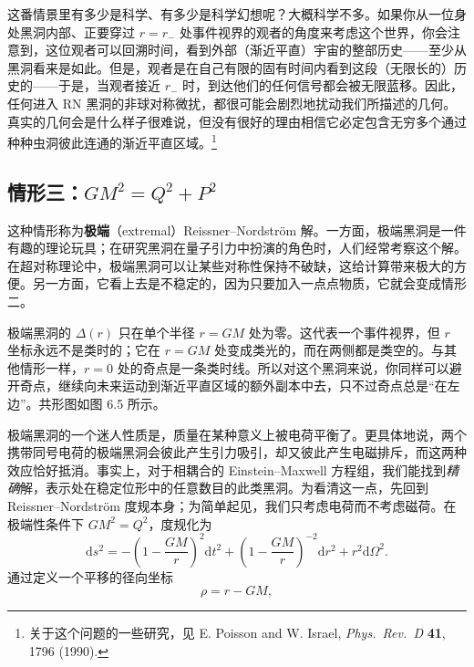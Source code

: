 

这番情景里有多少是科学、有多少是科学幻想呢？大概科学不多。如果你从一位身处黑洞内部、正要穿过 $r=r_{-}$ 处事件视界的观者的角度来考虑这个世界，你会注意到，这位观者可以回溯时间，看到外部（渐近平直）宇宙的整部历史——至少从黑洞看来是如此。但是，观者是在自己有限的固有时间内看到这段（无限长的）历史的——于是，当观者接近 $r_{-}$ 时，到达他们的任何信号都会被无限蓝移。因此，任何进入 RN 黑洞的非球对称微扰，都很可能会剧烈地扰动我们所描述的几何。真实的几何会是什么样子很难说，但没有很好的理由相信它必定包含无穷多个通过种种虫洞彼此连通的渐近平直区域。\footnote{关于这个问题的一些研究，见 E. Poisson and W. Israel, \emph{Phys.\ Rev.\ D} \textbf{41}, 1796 (1990).}

\subsection*{情形三：$GM^{2}=Q^{2}+P^{2}$}

这种情形称为\textbf{极端}（extremal）Reissner–Nordström 解。一方面，极端黑洞是一件有趣的理论玩具；在研究黑洞在量子引力中扮演的角色时，人们经常考察这个解。在超对称理论中，极端黑洞可以让某些对称性保持不破缺，这给计算带来极大的方便。另一方面，它看上去是不稳定的，因为只要加入一点点物质，它就会变成情形二。

极端黑洞的 $\Delta(r)$ 只在单个半径 $r=GM$ 处为零。这代表一个事件视界，但 $r$ 坐标永远不是类时的；它在 $r=GM$ 处变成类光的，而在两侧都是类空的。与其他情形一样，$r=0$ 处的奇点是一条类时线。所以对这个黑洞来说，你同样可以避开奇点，继续向未来运动到渐近平直区域的额外副本中去，只不过奇点总是“在左边”。共形图如图 6.5 所示。

极端黑洞的一个迷人性质是，质量在某种意义上被电荷平衡了。更具体地说，两个携带同号电荷的极端黑洞会彼此产生引力吸引，却又彼此产生电磁排斥，而这两种效应恰好抵消。事实上，对于相耦合的 Einstein–Maxwell 方程组，我们能找到\emph{精确}解，表示处在稳定位形中的任意数目的此类黑洞。为看清这一点，先回到 Reissner–Nordström 度规本身；为简单起见，我们只考虑电荷而不考虑磁荷。在极端性条件下 $GM^{2}=Q^{2}$，度规化为
\begin{equation*}
\mathrm{d}s^{2} = -\left(1-\frac{GM}{r}\right)^{2}\mathrm{d}t^{2} + \left(1-\frac{GM}{r}\right)^{-2}\mathrm{d}r^{2} + r^{2}\mathrm{d}\Omega^{2}.
\tag{6.58}
\end{equation*}
通过定义一个平移的径向坐标
\begin{equation*}
\rho = r - GM,
\tag{6.59}
\end{equation*}

